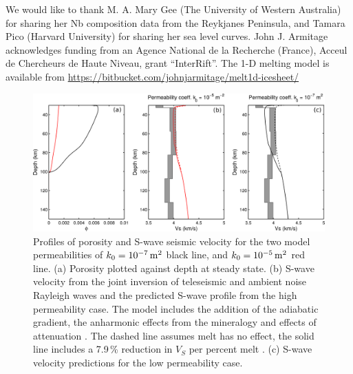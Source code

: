 \documentclass[draft,linenumbers]{agujournal2018}
\begin{document}
\acknowledgments
We would like to thank M. A. Mary Gee (The University of Western Australia) for sharing her Nb composition data from the Reykjanes Peninsula, and Tamara Pico (Harvard University) for sharing her sea level curves. John J. Armitage acknowledges funding from an Agence National de la Recherche (France), Acceul de Chercheurs de Haute Niveau, grant “InterRift”. The 1-D melting model is available from \url{https://bitbucket.com/johnjarmitage/melt1d-icesheet/}



\clearpage
\pagebreak
\newpage

\begin{figure}
\includegraphics{../figures/version05/supp-figure4.png}
\caption{Profiles of porosity and S-wave seismic velocity for the two model permeabilities of $k_{0} = 10^{-7}\rm\,m^{2}$ black line, and $k_{0} = 10^{-5}\rm\,m^{2}$ red line. (a) Porosity plotted against depth at steady state. (b) S-wave velocity from the joint inversion of teleseismic and ambient noise Rayleigh waves \citep{harmon-2016} and the predicted S-wave profile from the high permeability case. The model includes the addition of the adiabatic gradient, the anharmonic effects from the mineralogy and effects of attenuation \citep{goes-etal-2012}. The dashed line assumes melt has no effect, the solid line includes a 7.9\,\% reduction in $V_{S}$ per percent melt \citep{hammond-2000}. (c) S-wave velocity predictions for the low permeability case.}
\label{fg:2}
\end{figure}
\end{document}

